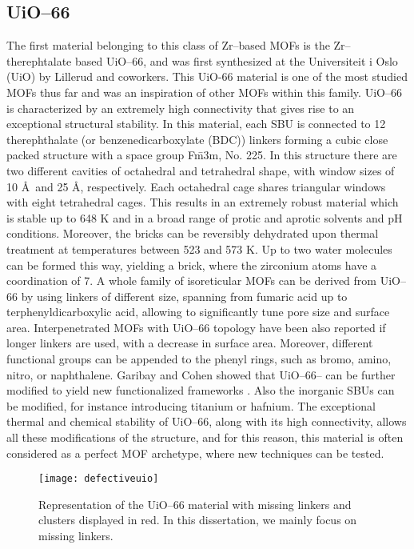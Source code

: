 \subsection*{UiO--66}
The first material belonging to this class of Zr--based MOFs is the Zr--therephtalate based UiO--66, and was first synthesized at the Universiteit i Oslo (UiO) by Lillerud and coworkers\cite{cavka2008new}. This UiO-66 material is one of the most studied MOFs thus far and was an inspiration of other MOFs within this family.  UiO--66 is characterized by an extremely high connectivity that gives rise to an exceptional structural stability. In this material, each  SBU is connected to 12 therephthalate (or benzenedicarboxylate (BDC)) linkers forming a cubic close packed structure with a space group F\={m}3m, No. 225. In this structure there are two different cavities of octahedral and tetrahedral shape, with window sizes of 10 \AA\ and 25 \AA, respectively. Each octahedral cage shares triangular windows with eight tetrahedral cages. 
This results in an extremely robust material which is stable up to 648 K and in a broad range of protic and aprotic solvents and pH conditions. Moreover, the  bricks can be reversibly dehydrated upon thermal treatment at temperatures between 523 and 573 K. Up to two water molecules can be formed this way, yielding a  brick, where the zirconium atoms have a coordination of 7\cite{valenzano2011disclosing}. 
\npar
A whole family of isoreticular MOFs can be derived from UiO--66 by using linkers of different size, spanning from fumaric acid\cite{wissmann2012modulated} up to terphenyldicarboxylic acid\cite{schaate2011modulated}, allowing to significantly tune pore size and surface area. Interpenetrated MOFs with UiO--66 topology have been also reported if longer linkers are used\cite{schaate2011porous}, with a decrease in surface area. Moreover, different functional groups can be appended to the phenyl rings, such as bromo, amino, nitro, or naphthalene. Garibay and Cohen showed that UiO--66-- can be further modified to yield new functionalized frameworks \cite{garibay2010isoreticular}. Also the inorganic SBUs can be modified, for instance introducing titanium or hafnium\cite{kim2012postsynthetic}. The exceptional thermal and chemical stability of UiO--66, along with its high connectivity, allows all these modifications of the structure, and for this reason, this material is often considered as a perfect MOF archetype, where new techniques can be tested. 

\begin{figure}[!htbp]
	\centering
 	\texttt{[image: defectiveuio]}
	\caption{Representation of the UiO--66 material with missing linkers and clusters displayed in red. In this dissertation, we mainly focus on missing linkers.}
	\label{fig:defectiveuio}
\end{figure}

